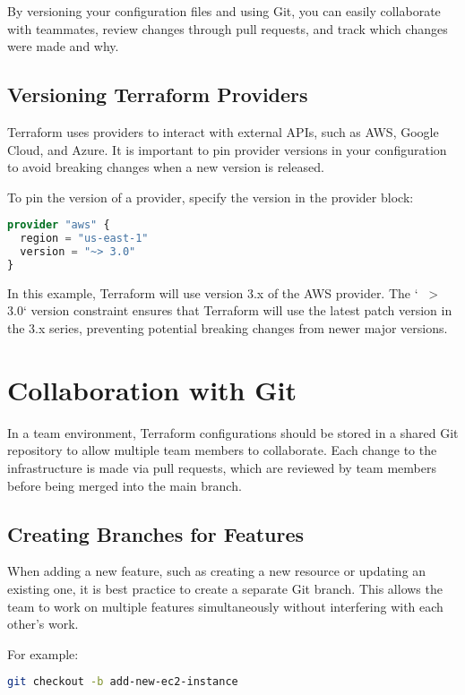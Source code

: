 By versioning your configuration files and using Git, you can easily collaborate with teammates, review changes through pull requests, and track which changes were made and why.

\subsection{Versioning Terraform Providers}

Terraform uses providers to interact with external APIs, such as AWS, Google Cloud, and Azure. It is important to pin provider versions in your configuration to avoid breaking changes when a new version is released.

To pin the version of a provider, specify the version in the provider block:

\begin{lstlisting}[language=terraform]
provider "aws" {
  region = "us-east-1"
  version = "~> 3.0"
}
\end{lstlisting}

In this example, Terraform will use version 3.x of the AWS provider. The `~ > 3.0` version constraint ensures that Terraform will use the latest patch version in the 3.x series, preventing potential breaking changes from newer major versions.

\section{Collaboration with Git}

In a team environment, Terraform configurations should be stored in a shared Git repository to allow multiple team members to collaborate. Each change to the infrastructure is made via pull requests, which are reviewed by team members before being merged into the main branch.

\subsection{Creating Branches for Features}

When adding a new feature, such as creating a new resource or updating an existing one, it is best practice to create a separate Git branch. This allows the team to work on multiple features simultaneously without interfering with each other's work.

For example:

\begin{lstlisting}[language=bash]
git checkout -b add-new-ec2-instance
\end{lstlisting}

